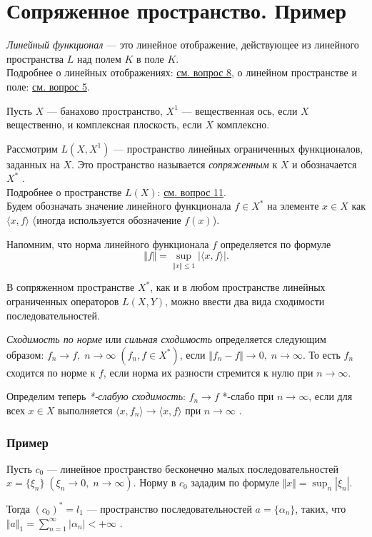 \section{Сопряженное пространство. Пример}
\textit{Линейный функционал} --- это линейное отображение, действующее из линейного пространства $L$ над полем $K$ в поле $K$.\\
Подробнее о линейных отображениях: \hyperref[sec:q-8]{см. вопрос 8}, о линейном пространстве и поле: \hyperref[sec:q-5]{см. вопрос 5}.

Пусть $X$ --- банахово пространство, $X^1$ --- вещественная ось, если $X$ вещественно, и комплексная плоскость, если $X$ комплексно.

Рассмотрим $L(X, X^1)$ --- пространство линейных ограниченных функционалов, заданных на $X$. Это пространство называется \textit{сопряженным} к $X$ и обозначается $X^*$ \cite[с.~169]{trenogin}.\\
Подробнее о пространстве $L(X)$: \hyperref[sec:q-11]{см. вопрос 11}.\\

Будем обозначать значение линейного функционала $f \in X^*$ на элементе $x \in X$ как $\langle x,f\rangle$ (иногда используется обозначение $f(x)$).

Напомним, что норма линейного функционала $f$ определяется по формуле
$$\Vert f \Vert = \sup_{\Vert x \Vert \leqslant 1}| \langle x, f\rangle|.$$

В сопряженном пространстве $X^*$, как и в любом пространстве линейных ограниченных операторов $L(X, Y)$, можно ввести два вида сходимости последовательностей.

\textit{Сходимость по норме} или \textit{сильная сходимость} определяется следующим образом: $f_n \rightarrow f,\; n \rightarrow \infty\;(f_n, f \in X^*)$, если $\Vert f_n - f \Vert \rightarrow 0, \; n \rightarrow \infty$. То есть $f_n$ сходится по норме к $f$, если норма их разности стремится к нулю при $n \rightarrow \infty$.

Определим теперь \textit{*-слабую сходимость}: $f_n \rightarrow f$ *-слабо при $n \rightarrow \infty$, если для всех $x \in X$ выполняется $\langle x, f_n \rangle \rightarrow \langle x, f \rangle$ при $n \rightarrow \infty$ \cite[с.~170]{trenogin}.

\subsubsection*{Пример}
Пусть $c_0$ --- линейное пространство бесконечно малых последовательностей $x = \{\xi_n\}\;(\xi_n \rightarrow 0,\; n \rightarrow \infty)$. Норму в $c_0$ зададим по формуле $\displaystyle \Vert x \Vert = \sup_{n}|\xi_n|$.

Тогда $(c_0)^* = l_1$ --- пространство последовательностей $a = \{\alpha_n\}$, таких, что $\displaystyle \Vert a \Vert_1 = \sum_{n = 1}^{\infty}|\alpha_n|<+\infty$ \cite[с.~170]{trenogin}.